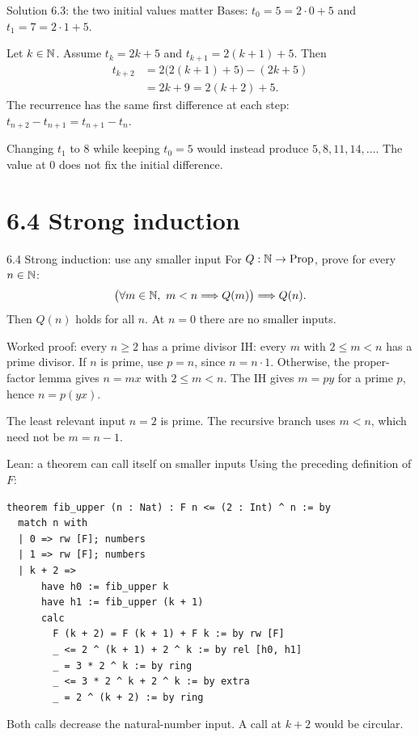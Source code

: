 \begin{frame}{Solution 6.3: the two initial values matter}
Bases: $t_0=5=2\cdot0+5$ and $t_1=7=2\cdot1+5$.

Let $k\in\mathbb{N}$. Assume $t_k=2k+5$ and $t_{k+1}=2(k+1)+5$.
Then
\[
\begin{aligned}
 t_{k+2}&=2\bigl(2(k+1)+5\bigr)-(2k+5)\\
 &=2k+9=2(k+2)+5.
\end{aligned}
\]
The recurrence has the same first difference at each step:
$t_{n+2}-t_{n+1}=t_{n+1}-t_n$.

Changing $t_1$ to $8$ while keeping $t_0=5$ would instead produce
$5,8,11,14,\ldots$. The value at $0$ does not fix the initial difference.
\end{frame}

\section{6.4 Strong induction}
\begin{frame}{6.4 Strong induction: use any smaller input}
For $Q:\mathbb{N}\to\mathrm{Prop}$, prove for every $n\in\mathbb{N}$:
\[
 \bigl(\forall m\in\mathbb{N},\ m<n\Longrightarrow Q(m)\bigr)
 \Longrightarrow Q(n).
\]
Then $Q(n)$ holds for all $n$. At $n=0$ there are no smaller inputs.
\begin{block}{Worked proof: every $n\ge2$ has a prime divisor}
IH: every $m$ with $2\le m<n$ has a prime divisor.
If $n$ is prime, use $p=n$, since $n=n\cdot1$.
Otherwise, the proper-factor lemma gives $n=mx$ with $2\le m<n$.
The IH gives $m=py$ for a prime $p$, hence $n=p(yx)$.
\end{block}
The least relevant input $n=2$ is prime. The recursive branch uses
$m<n$, which need not be $m=n-1$.
\end{frame}

\begin{frame}[fragile]{Lean: a theorem can call itself on smaller inputs}
Using the preceding definition of $F$:
\begin{lstlisting}
theorem fib_upper (n : Nat) : F n <= (2 : Int) ^ n := by
  match n with
  | 0 => rw [F]; numbers
  | 1 => rw [F]; numbers
  | k + 2 =>
      have h0 := fib_upper k
      have h1 := fib_upper (k + 1)
      calc
        F (k + 2) = F (k + 1) + F k := by rw [F]
        _ <= 2 ^ (k + 1) + 2 ^ k := by rel [h0, h1]
        _ = 3 * 2 ^ k := by ring
        _ <= 3 * 2 ^ k + 2 ^ k := by extra
        _ = 2 ^ (k + 2) := by ring
\end{lstlisting}
Both calls decrease the natural-number input. A call at $k+2$ would be circular.
\end{frame}

